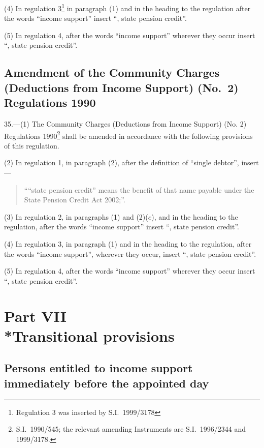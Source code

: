 \documentclass[12pt,a4paper]{article}
\begin{document}
(4) In regulation 3\footnote{Regulation 3 was inserted by S.I.\ 1999/3178} in paragraph (1) and in the heading to the regulation after the words “income support” insert “, state pension credit”.

(5) In regulation 4, after the words “income support” wherever they occur insert “, state pension credit”.

\subsection[35. Amendment of the Community Charges (Deductions from Income Support) (No.\ 2) Regulations 1990]{Amendment of the Community Charges (Deductions from Income Support) (No.\ 2) Regulations 1990}

35.---(1)  The Community Charges (Deductions from Income Support) (No. 2) Regulations 1990\footnote{S.I.\ 1990/545; the relevant amending Instruments are S.I.\ 1996/2344 and 1999/3178.} shall be amended in accordance with the following provisions of this regulation.

\pagebreak[3]

(2) In regulation 1, in paragraph (2), after the definition of “single debtor”, insert—
\begin{quotation}
““state pension credit” means the benefit of that name payable under the State Pension Credit Act 2002;”.
\end{quotation}

(3) In regulation 2, in paragraphs (1) and (2)($e$), and in the heading to the regulation, after the words “income support” insert “, state pension credit”.

(4) In regulation 3, in paragraph (1) and in the heading to the regulation, after the words “income support”, wherever they occur, insert “, state pension credit”.

(5) In regulation 4, after the words “income support” wherever they occur insert “, state pension credit”.

\section[Part VII --- Transitional provisions]{Part VII\\*Transitional provisions}

\subsection[36. Persons entitled to income support immediately before the appointed day]{Persons entitled to income support immediately before the appointed day}
\end{document}
